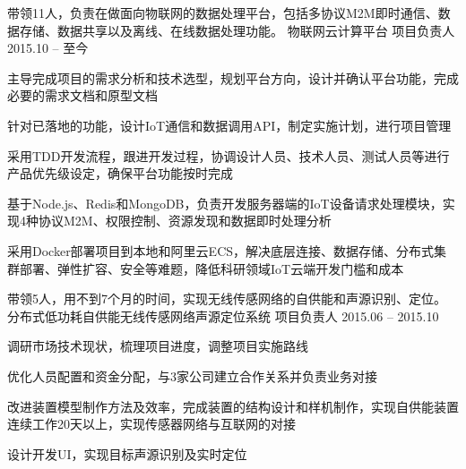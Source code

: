 





\begin{cventries}


\cventry
{带领11人，负责在做面向物联网的数据处理平台，包括多协议M2M即时通信、数据存储、数据共享以及离线、在线数据处理功能。} %
{物联网云计算平台} %
{项目负责人} %
{2015.10 -- 至今} %
{ %
\begin{cvitems}
\item {主导完成项目的需求分析和技术选型，规划平台方向，设计并确认平台功能，完成必要的需求文档和原型文档}
\item {针对已落地的功能，设计IoT通信和数据调用API，制定实施计划，进行项目管理}
\item {采用TDD开发流程，跟进开发过程，协调设计人员、技术人员、测试人员等进行产品优先级设定，确保平台功能按时完成}
\item{基于Node.js、Redis和MongoDB，负责开发服务器端的IoT设备请求处理模块，实现4种协议M2M、权限控制、资源发现和数据即时处理分析}
\item{采用Docker部署项目到本地和阿里云ECS，解决底层连接、数据存储、分布式集群部署、弹性扩容、安全等难题，降低科研领域IoT云端开发门槛和成本}
\end{cvitems}
}





\cventry
{带领5人，用不到7个月的时间，实现无线传感网络的自供能和声源识别、定位。} %
{分布式低功耗自供能无线传感网络声源定位系统} %
{项目负责人} %
{2015.06 -- 2015.10} %
{ %
\begin{cvitems}
\item {调研市场技术现状，梳理项目进度，调整项目实施路线}
\item {优化人员配置和资金分配，与3家公司建立合作关系并负责业务对接}
\item{改进装置模型制作方法及效率，完成装置的结构设计和样机制作，实现自供能装置连续工作20天以上，实现传感器网络与互联网的对接}
\item{设计开发UI，实现目标声源识别及实时定位}
\end{cvitems} 
}


\end{cventries}
